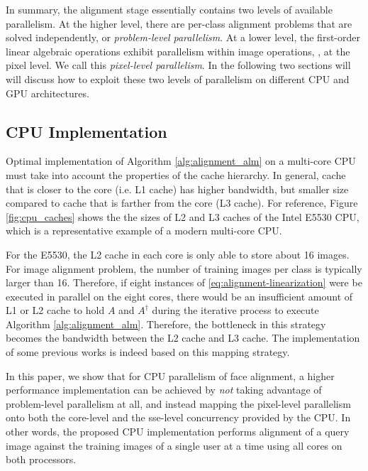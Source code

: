 \documentclass[10pt,twocolumn,letterpaper]{article}
\begin{document}
In summary, the alignment stage essentially contains two levels of available
parallelism. At the higher level, there are per-class alignment problems
that are solved independently, or \emph{problem-level parallelism}.  At a lower
level, the first-order linear algebraic operations exhibit parallelism within
image operations, \ie, at the pixel level.  We call this \emph{pixel-level
parallelism}.  In the following two sections will will discuss how to
exploit these two levels of parallelism on different CPU and GPU architectures.

\subsection{CPU Implementation} 
\label{sec:alignment_implementation_cpu}

Optimal implementation of Algorithm \ref{alg:alignment_alm} on a multi-core CPU must take 
into account the properties of the cache hierarchy. In general, cache that is 
closer to the core (i.e. L1 cache) has higher bandwidth, but smaller size compared to cache
that is farther from the core (L3 cache).  For reference, Figure \ref{fig:cpu_caches} 
shows the the sizes of L2 and L3 caches of the Intel E5530 CPU, 
which is a representative example of a modern multi-core CPU. 

For the E5530, the L2 cache in each core is only able to store about 16 images.
For image alignment problem, the number of training images per class is
typically larger than 16.  Therefore, if eight instances of
\eqref{eq:alignment-linearization} were be executed in parallel on the eight
cores, there would be an insufficient amount of L1 or L2 cache to hold $A$ and
$A^\dagger$ during the iterative process to execute Algorithm
\ref{alg:alignment_alm}. Therefore, the bottleneck in this strategy becomes the
bandwidth between the L2 cache and L3 cache. The implementation of some
previous works \cite{WagnerA2009-CVPR,WagnerA2011-PAMI} is indeed based on this
mapping strategy.

In this paper, we show that for CPU parallelism of face alignment, a higher
performance implementation can be achieved by {\em not} taking advantage of
problem-level parallelism at all, and instead mapping the pixel-level parallelism
onto both the core-level and the sse-level concurrency provided by the CPU.  In
other words, the proposed CPU implementation performs alignment of a query
image against the training images of a single user at a time using all cores on
both processors.
\end{document}
